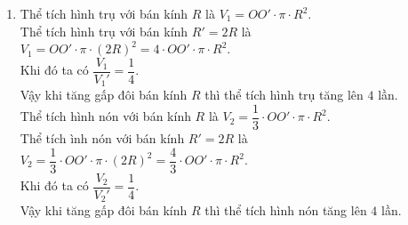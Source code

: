 \begin{vd}
{\begin{enumerate}
Vậy thể tích phần xốp bị gọt bỏ là $V=V_{\text{trụ}}-V_{\text{nón}}=24\pi$ cm$^3$.
\item Thể tích hình trụ với bán kính $R$ là $V_1=OO'\cdot \pi\cdot R^2$.\\
Thể tích hình trụ với bán kính $R'=2R$ là $V_1=OO'\cdot \pi \cdot (2R)^2=4\cdot OO'\cdot \pi\cdot R^2$.\\
Khi đó ta có $\dfrac{V_1}{V_1'}=\dfrac{1}{4}$.\\
Vậy khi tăng gấp đôi bán kính $R$ thì thể tích hình trụ tăng lên $4$ lần.\\
Thể tích hình nón với bán kính $R$ là $V_2=\dfrac{1}{3}\cdot OO'\cdot \pi\cdot R^2$.\\
Thể tích ình nón với bán kính $R'=2R$ là $V_2=\dfrac{1}{3}\cdot OO'\cdot \pi \cdot (2R)^2=\dfrac{4}{3}\cdot OO'\cdot \pi\cdot R^2$.\\
Khi đó ta có $\dfrac{V_2}{V_2'}=\dfrac{1}{4}$.\\
Vậy khi tăng gấp đôi bán kính $R$ thì thể tích hình nón tăng lên $4$ lần.
\end{enumerate}
}
\end{vd}

